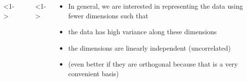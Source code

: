 \begin{frame}
  \begin{columns}
    <1->
    \begin{overlayarea}{\textwidth}{\textheight}
      \makebox[\textwidth][c]{\usebox{\pcacolorcontent}}
    \end{overlayarea}

    <1->
    \begin{overlayarea}{\textwidth}{\textheight}
      \begin{itemize}\justifying
        \item[] In general, we are interested in representing the data using fewer dimensions such that
        \item<2-> the data has high variance along these dimensions
        \item<3-> the dimensions are linearly independent (uncorrelated)
        \item<4-> (even better if they are orthogonal because that is a very convenient basis)
      \end{itemize}
    \end{overlayarea}
  \end{columns}
\end{frame}

